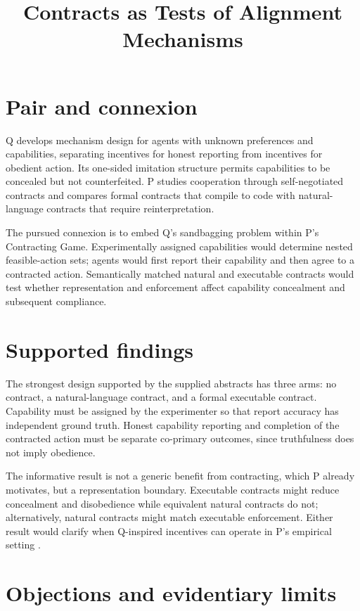 \documentclass{article}
\title{Contracts as Tests of Alignment Mechanisms}
\begin{document}
\maketitle

\section{Pair and connexion}

Q develops mechanism design for agents with unknown preferences and capabilities, separating incentives for honest reporting from incentives for obedient action. Its one-sided imitation structure permits capabilities to be concealed but not counterfeited. P studies cooperation through self-negotiated contracts and compares formal contracts that compile to code with natural-language contracts that require reinterpretation.

The pursued connexion is to embed Q's sandbagging problem within P's Contracting Game. Experimentally assigned capabilities would determine nested feasible-action sets; agents would first report their capability and then agree to a contracted action. Semantically matched natural and executable contracts would test whether representation and enforcement affect capability concealment and subsequent compliance.

\section{Supported findings}

The strongest design supported by the supplied abstracts has three arms: no contract, a natural-language contract, and a formal executable contract. Capability must be assigned by the experimenter so that report accuracy has independent ground truth. Honest capability reporting and completion of the contracted action must be separate co-primary outcomes, since truthfulness does not imply obedience.

The informative result is not a generic benefit from contracting, which P already motivates, but a representation boundary. Executable contracts might reduce concealment and disobedience while equivalent natural contracts do not; alternatively, natural contracts might match executable enforcement. Either result would clarify when Q-inspired incentives can operate in P's empirical setting .

\section{Objections and evidentiary limits}
\end{document}
